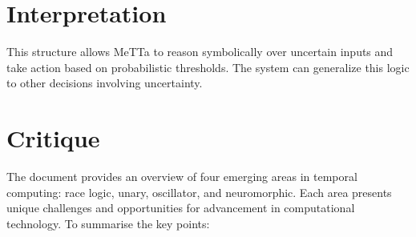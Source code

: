\documentclass{article}
\begin{document}
\section{Interpretation}
This structure allows MeTTa to reason symbolically over uncertain inputs and take action based on probabilistic thresholds. The system can generalize this logic to other decisions involving uncertainty.

\section{Critique}

The document provides an overview of four emerging areas in temporal computing: race logic, unary, oscillator, and neuromorphic. Each area presents unique challenges and opportunities for advancement in computational technology. To summarise the key points:
\end{document}
